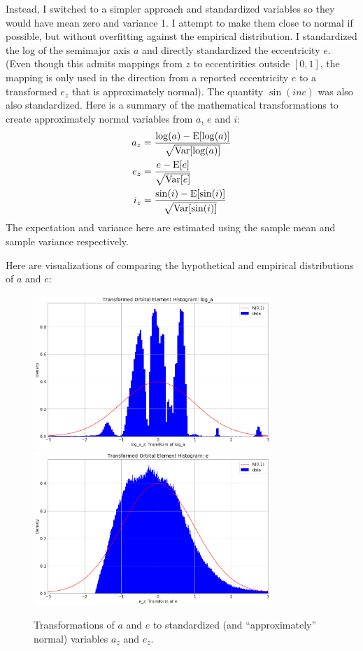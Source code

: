 Instead, I switched to a simpler approach and standardized variables so they would have mean zero and variance 1.
I attempt to make them close to normal if possible, but without overfitting against the empirical distribution.
I standardized the log of the semimajor axis $a$ and directly standardized the eccentricity $e$.
(Even though this admits mappings from $z$ to eccentirities outside $[0,1]$, the mapping is only used in the direction
from a reported eccentricity $e$ to a transformed $e_z$ that is approximately normal).
The quantity $\sin(inc)$ was also also standardized.
Here is a summary of the mathematical transformations to create approximately normal variables from $a$, $e$ and $i$:
\begin{align*}
a_z &= \frac{\log(a) - \mathrm{E}[\log(a)]}{\sqrt{\mathrm{Var}[\log(a)]}} \\
e_z &= \frac{e - \mathrm{E}[e]}{\sqrt{\mathrm{Var}[e]}} \\
i_z &= \frac{\sin(i) - \mathrm{E}[\sin(i)]}{\sqrt{\mathrm{Var}[\sin(i)]}}
\end{align*}
The expectation and variance here are estimated using the sample mean and sample variance respectively.

Here are visualizations of comparing the hypothetical and empirical distributions of $a$ and $e$:
\begin{figure}[hbt!]
\begin{center}
\includegraphics[width=0.8\textwidth]{../figs/elts_cov/log_a_z.png}
\includegraphics[width=0.8\textwidth]{../figs/elts_cov/e_z.png}
\caption{Transformations of $a$ and $e$ to standardized (and ``approximately'' normal) variables $a_z$ and $e_z$.}
\end{center}
\end{figure}
\clearpage

